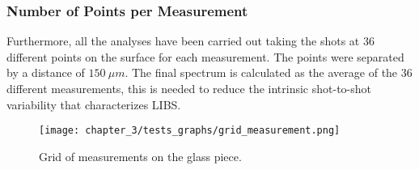 \subsubsection{Number of Points per Measurement}
\label{subsubsec:number_points_mesurement}
Furthermore, all the analyses have been carried out taking the shots at 36 different points on the surface for each measurement. The points were separated by a distance of $150 \: \mu m$. The final spectrum is calculated as the average of the 36 different measurements, this is needed to reduce the intrinsic shot-to-shot variability that characterizes LIBS. 
\begin{figure}[H]
    \centering
    \texttt{[image: chapter\_3/tests\_graphs/grid\_measurement.png]} 
    \caption{Grid of measurements on the glass piece. }
    \label{fig:grid_measurement}
\end{figure}

